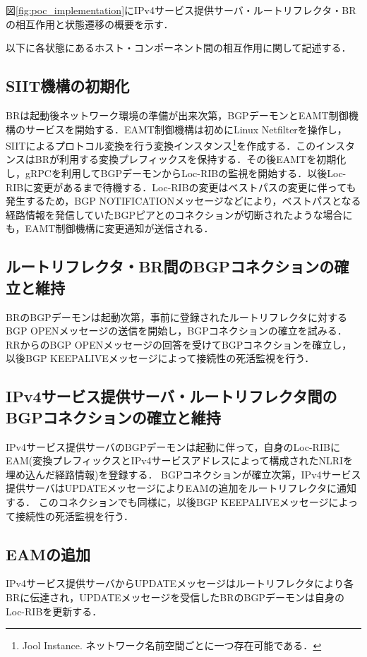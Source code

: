 図\ref{fig:poc_implementation}にIPv4サービス提供サーバ・ルートリフレクタ・BRの相互作用と状態遷移の概要を示す．

以下に各状態にあるホスト・コンポーネント間の相互作用に関して記述する．

\subsection{SIIT機構の初期化}
BRは起動後ネットワーク環境の準備が出来次第，BGPデーモンとEAMT制御機構のサービスを開始する．EAMT制御機構は初めにLinux Netfilterを操作し，SIITによるプロトコル変換を行う変換インスタンス\footnote{Jool Instance. ネットワーク名前空間ごとに一つ存在可能である．}を作成する．このインスタンスはBRが利用する変換プレフィックスを保持する．その後EAMTを初期化し，gRPCを利用してBGPデーモンからLoc-RIBの監視を開始する．以後Loc-RIBに変更があるまで待機する．Loc-RIBの変更はベストパスの変更に伴っても発生するため，BGP NOTIFICATIONメッセージなどにより，ベストパスとなる経路情報を発信していたBGPピアとのコネクションが切断されたような場合にも，EAMT制御機構に変更通知が送信される．


\subsection{ルートリフレクタ・BR間のBGPコネクションの確立と維持}
BRのBGPデーモンは起動次第，事前に登録されたルートリフレクタに対するBGP OPENメッセージの送信を開始し，BGPコネクションの確立を試みる．
RRからのBGP OPENメッセージの回答を受けてBGPコネクションを確立し，以後BGP KEEPALIVEメッセージによって接続性の死活監視を行う．



\subsection{IPv4サービス提供サーバ・ルートリフレクタ間のBGPコネクションの確立と維持}
IPv4サービス提供サーバのBGPデーモンは起動に伴って，自身のLoc-RIBにEAM(変換プレフィックスとIPv4サービスアドレスによって構成されたNLRIを埋め込んだ経路情報)を登録する．
BGPコネクションが確立次第，IPv4サービス提供サーバはUPDATEメッセージによりEAMの追加をルートリフレクタに通知する．
このコネクションでも同様に，以後BGP KEEPALIVEメッセージによって接続性の死活監視を行う．


\subsection{EAMの追加}
IPv4サービス提供サーバからUPDATEメッセージはルートリフレクタにより各BRに伝達され，UPDATEメッセージを受信したBRのBGPデーモンは自身のLoc-RIBを更新する．

